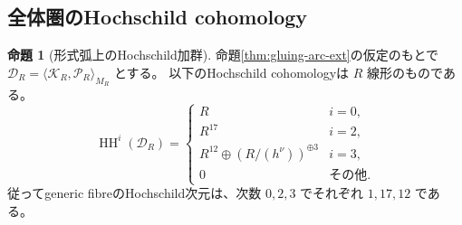 \documentclass[a4paper,11pt]{ltjsarticle}
\theoremstyle{definition}
\newtheorem{theorem}{命題}[section]
\newcommand{\HH}{\operatorname{HH}}
\begin{document}
\subsection{全体圏のHochschild cohomology}

\begin{theorem}[形式弧上のHochschild加群]\label{thm:gluing-arc-hh}
命題\ref{thm:gluing-arc-ext}の仮定のもとで
$\mathcal D_R=\langle\mathcal K_R,\mathcal P_R\rangle_{M_R}$ とする。
以下のHochschild cohomologyは $R$ 線形のものである。
\begin{equation}\label{eq:gluing-arc-hh}
 \HH^i(\mathcal D_R)=
 \begin{cases}
 R&i=0,\\
 R^{17}&i=2,\\
 R^{12}\oplus(R/(h^{\nu}))^{\oplus3}&i=3,\\
 0&\text{その他}.
 \end{cases}
\end{equation}
従ってgeneric fibreのHochschild次元は、次数 $0,2,3$ でそれぞれ $1,17,12$ である。
\end{theorem}
\end{document}
